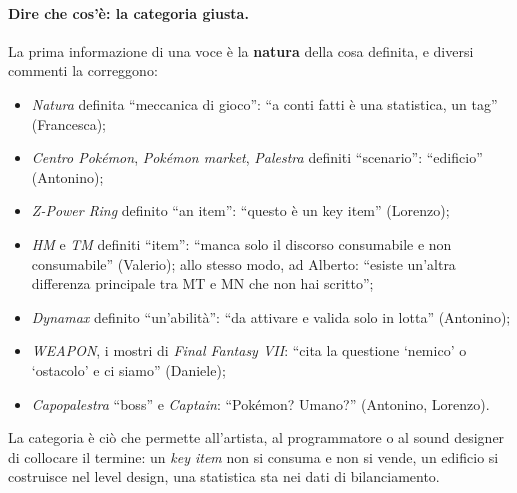 \paragraph{Dire che cos'è: la categoria giusta.} La prima informazione di una
voce è la \textbf{natura} della cosa definita, e diversi commenti la
correggono:
\begin{itemize}
  \item \emph{Natura} definita ``meccanica di gioco'': ``a conti fatti è una
        statistica, un tag'' (Francesca);
  \item \emph{Centro Pokémon}, \emph{Pokémon market}, \emph{Palestra} definiti
        ``scenario'': ``edificio'' (Antonino);
  \item \emph{Z-Power Ring} definito ``an item'': ``questo è un key item''
        (Lorenzo);
  \item \emph{HM} e \emph{TM} definiti ``item'': ``manca solo il discorso
        consumabile e non consumabile'' (Valerio); allo stesso modo, ad
        Alberto: ``esiste un'altra differenza principale tra MT e MN che non
        hai scritto'';
  \item \emph{Dynamax} definito ``un'abilità'': ``da attivare e valida solo in
        lotta'' (Antonino);
  \item \emph{WEAPON}, i mostri di \emph{Final Fantasy VII}: ``cita la
        questione `nemico' o `ostacolo' e ci siamo'' (Daniele);
  \item \emph{Capopalestra} ``boss'' e \emph{Captain}: ``Pokémon? Umano?''
        (Antonino, Lorenzo).
\end{itemize}
La categoria è ciò che permette all'artista, al programmatore o al sound
designer di collocare il termine: un \emph{key item} non si consuma e non si
vende, un edificio si costruisce nel level design, una statistica sta nei dati
di bilanciamento.


